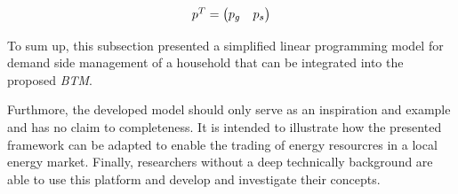 \begin{equation*}
    \begin{array}{ll@{}ll}
		p^{T} = 
		\begin{pmatrix}
			p_{g} &
			p_{s}
		\end{pmatrix}
    \end{array}
\end{equation*}


To sum up, this subsection presented a simplified linear 
programming model for demand side management of a household
that can be integrated into the proposed \textit{BTM}.

Furthmore, the developed model should only serve as an inspiration and example
and has no claim to completeness. 
It is intended to illustrate how the presented framework can be adapted to enable the trading 
of energy resourcres in a local energy market. 
Finally, researchers without a deep technically background are able to use this platform and
develop and investigate their concepts.

\clearpage